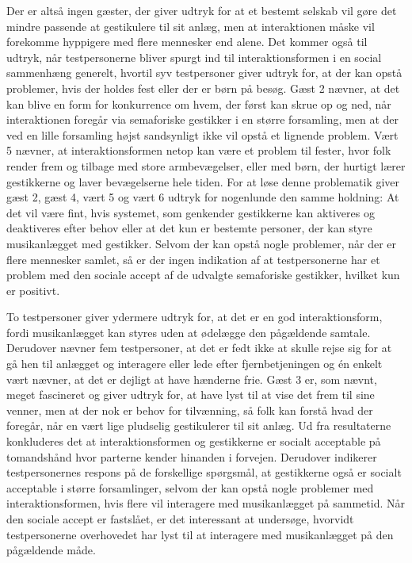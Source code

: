 Der er altså ingen gæster, der giver udtryk for at et bestemt selskab vil gøre det mindre passende at gestikulere til sit anlæg, men at interaktionen måske vil forekomme hyppigere med flere mennesker end alene. Det kommer også til udtryk, når testpersonerne bliver spurgt ind til interaktionsformen i en social sammenhæng generelt, hvortil syv testpersoner giver udtryk for, at der kan opstå problemer, hvis der holdes fest eller der er børn på besøg. Gæst 2 nævner, at det kan blive en form for konkurrence om hvem, der først kan skrue op og ned, når interaktionen foregår via semaforiske gestikker i en større forsamling, men at der ved en lille forsamling højst sandsynligt ikke vil opstå et lignende problem. Vært 5 nævner, at interaktionsformen netop kan være et problem til fester, hvor folk render frem og tilbage med store armbevægelser, eller med børn, der hurtigt lærer gestikkerne og laver bevægelserne hele tiden. For at løse denne problematik giver gæst 2, gæst 4, vært 5 og vært 6 udtryk for nogenlunde den samme holdning: At det vil være fint, hvis systemet, som genkender gestikkerne kan aktiveres og deaktiveres efter behov eller at det kun er bestemte personer, der kan styre musikanlægget med gestikker. Selvom der kan opstå nogle problemer, når der er flere mennesker samlet, så er der ingen indikation af at testpersonerne har et problem med den sociale accept af de udvalgte semaforiske gestikker, hvilket kun er positivt. 

To testpersoner giver ydermere udtryk for, at det er en god interaktionsform, fordi musikanlægget kan styres uden at ødelægge den pågældende samtale. Derudover nævner fem testpersoner, at det er fedt ikke at skulle rejse sig for at gå hen til anlægget og interagere eller lede efter fjernbetjeningen og én enkelt vært nævner, at det er dejligt at have hænderne frie. Gæst 3 er, som nævnt, meget fascineret og giver udtryk for, at have lyst til at vise det frem til sine venner, men at der nok er behov for tilvænning, så folk kan forstå hvad der foregår, når en vært lige pludselig gestikulerer til sit anlæg. \blankline
%
Ud fra resultaterne konkluderes det at interaktionsformen og gestikkerne er socialt acceptable på tomandshånd hvor parterne kender hinanden i forvejen. Derudover indikerer testpersonernes respons på de forskellige spørgsmål, at gestikkerne også er socialt acceptable i større forsamlinger, selvom der kan opstå nogle problemer med interaktionsformen, hvis flere vil interagere med musikanlægget på sammetid. Når den sociale accept er fastslået, er det interessant at undersøge, hvorvidt testpersonerne overhovedet har lyst til at interagere med musikanlægget på den pågældende måde. 

